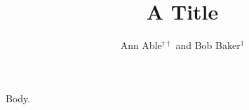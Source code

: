 \documentclass{revtex4-2}
\begin{document}
\title{A Title}
\author{Ann Able$^{\dagger\dagger}$ and Bob Baker$^{1}$}
\maketitle
Body.
\end{document}
